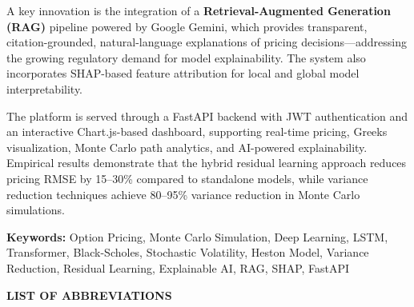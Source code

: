 \documentclass[12pt,a4paper]{report}
\begin{document}
A key innovation is the integration of a \textbf{Retrieval-Augmented Generation (RAG)} pipeline powered by Google Gemini, which provides transparent, citation-grounded, natural-language explanations of pricing decisions---addressing the growing regulatory demand for model explainability. The system also incorporates SHAP-based feature attribution for local and global model interpretability.

The platform is served through a FastAPI backend with JWT authentication and an interactive Chart.js-based dashboard, supporting real-time pricing, Greeks visualization, Monte Carlo path analytics, and AI-powered explainability. Empirical results demonstrate that the hybrid residual learning approach reduces pricing RMSE by 15--30\% compared to standalone models, while variance reduction techniques achieve 80--95\% variance reduction in Monte Carlo simulations.

\vspace{0.5cm}
\noindent\textbf{Keywords:} Option Pricing, Monte Carlo Simulation, Deep Learning, LSTM, Transformer, Black-Scholes, Stochastic Volatility, Heston Model, Variance Reduction, Residual Learning, Explainable AI, RAG, SHAP, FastAPI

\newpage
\tableofcontents

\newpage
\listoftables

\newpage
\listoffigures

\newpage
\begin{center}
\textbf{\Large LIST OF ABBREVIATIONS}
\end{center}

\vspace{1cm}
\end{document}
